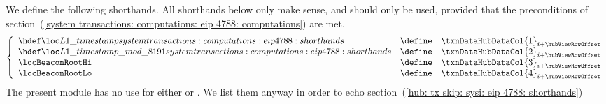 We define the following shorthands.
All shorthands below only make sense, and should only be used, provided that the preconditions of
section~(\ref{system transactions: computations: eip 4788: computations})
are met.
\[
	\left\{ \begin{array}{lcl}
		\locLayerOneTimeStamp             & \define & \txnDataHubDataCol {1} _{i + \hubViewRowOffset} \\
		\locLayerOneTimeStampModuloPrime  & \define & \txnDataHubDataCol {2} _{i + \hubViewRowOffset} \\
		\locBeaconRootHi                  & \define & \txnDataHubDataCol {3} _{i + \hubViewRowOffset} \\
		\locBeaconRootLo                  & \define & \txnDataHubDataCol {4} _{i + \hubViewRowOffset} \\
	\end{array} \right.
\]
\saNote{}
The present module has no use for either
\locBeaconRootHi{} or
\locBeaconRootLo{}.
We list them anyway in order to echo
section~(\ref{hub: tx skip: sysi: eip 4788: shorthands})
